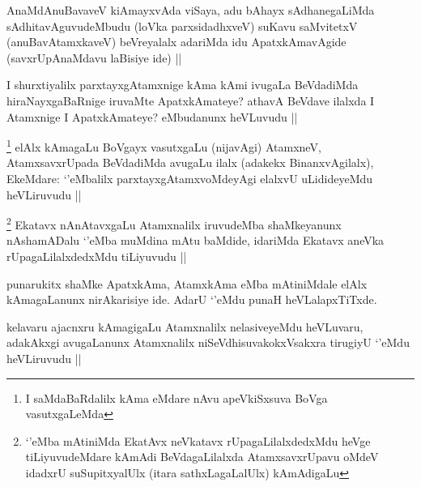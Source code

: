
\begin{artha}
AnaMdAnuBavaveV kiAmayxvAda viSaya, adu bAhayx sAdhanegaLiMda sAdhitavAguvudeMbudu (loVka parxsidadhxveV) suKavu saMvitetxV (anuBavAtamxkaveV) beVreyalalx adariMda idu ApatxkAmavAgide (savxrUpAnaMdavu laBisiye ide) ||
\end{artha}


\begin{artha}
I shurxtiyalilx parxtayxgAtamxnige kAma kAmi ivugaLa BeVdadiMda hiraNayxgaBaRnige iruvaMte ApatxkAmateye? athavA BeVdave ilalxda I Atamxnige I ApatxkAmateye? eMbudanunx heVLuvudu ||
\end{artha}

\begin{artha}
\footnote{I saMdaBaRdalilx kAma eMdare nAvu apeVkiSxsuva BoVga vasutxgaLeMda}
elAlx kAmagaLu BoVgayx vasutxgaLu (nijavAgi) AtamxneV, AtamxsavxrUpada BeVdadiMda avugaLu ilalx (adakekx BinanxvAgilalx), EkeMdare: `\stext'eMbalilx parxtayxgAtamxvoMdeyAgi elalxvU uLidideyeMdu heVLiruvudu ||
\end{artha}


\begin{artha}
\footnote{`\stext'eMba mAtiniMda EkatAvx neVkatavx rUpagaLilalxdedxMdu heVge tiLiyuvudeMdare kAmAdi BeVdagaLilalxda AtamxsavxrUpavu oMdeV idadxrU suSupitxyalUlx (itara sathxLagaLalUlx) kAmAdigaLu}
Ekatavx nAnAtavxgaLu Atamxnalilx iruvudeMba shaMkeyanunx nAshamADalu `\stext'eMba muMdina mAtu baMdide, idariMda Ekatavx aneVka rUpagaLilalxdedxMdu tiLiyuvudu ||
\end{artha}

\begin{artha}
punarukitx shaMke ApatxkAma, AtamxkAma eMba mAtiniMdale elAlx kAmagaLanunx nirAkarisiye ide. AdarU `\stext'eMdu punaH heVLalapxTiTxde.
\end{artha}


\begin{artha}
kelavaru ajacnxru kAmagigaLu Atamxnalilx nelasiveyeMdu heVLuvaru, adakAkxgi avugaLanunx Atamxnalilx niSeVdhisuvakokxVsakxra tirugiyU `\stext'eMdu heVLiruvudu ||
\end{artha}

